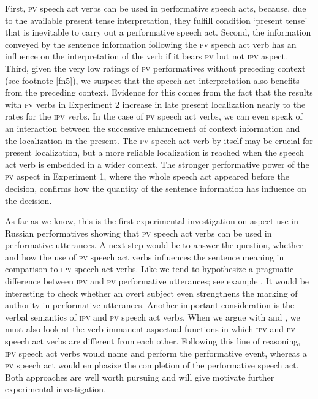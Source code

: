 \documentclass[output=paper,
colorlinks,
citecolor=brown,
newtxmath,
hidelinks
]{langscibook}
\begin{document}
First, \textsc{pv} speech act verbs can be used in performative speech acts, because, due to the available present tense interpretation, they fulfill condition ‘present tense’ that is inevitable to carry out a performative speech act. Second, the information conveyed by the sentence information following the \textsc{pv} speech act verb has an influence on the interpretation of the verb if it bears \textsc{pv} but not \textsc{ipv} aspect. Third, given the very low ratings of \textsc{pv} performatives without preceding context (see footnote \ref{fn5}), we suspect that the speech act interpretation also benefits from the preceding context. Evidence for this comes from the fact that the results with \textsc{pv} verbs in Experiment 2 increase in late present localization nearly to the rates for the \textsc{ipv} verbs. In the case of \textsc{pv} speech act verbs, we can even speak of an interaction between the successive enhancement of context information and the localization in the present. The \textsc{pv} speech act verb by itself may be crucial for present localization, but a more reliable localization is reached when the speech act verb is embedded in a wider context. The stronger performative power of the \textsc{pv} aspect in Experiment 1, where the whole speech act appeared before the decision, confirms how the quantity of the sentence information has influence on the decision.

As far as we know, this is the first experimental investigation on aspect use in Russian performatives showing that \textsc{pv} speech act verbs can be used in performative utterances. A next step would be to answer the question, whether and how the use of \textsc{pv} speech act verbs influences the sentence meaning in comparison to \textsc{ipv} speech act verbs.  Like \citeauthor{Israeli2001} we tend to hypothesize a pragmatic difference between \textsc{ipv} and \textsc{pv} performative utterances; see example . It would be interesting to check whether an overt subject even strengthens the marking of authority in performative utterances. Another important consideration is the verbal semantics of \textsc{ipv} and \textsc{pv} speech act verbs. When we argue with \citet{Breu1980} and \citet{Dewit2017}, we must also look at the verb immanent aspectual functions in which \textsc{ipv} and \textsc{pv} speech act verbs are different from each other. Following this line of reasoning, \textsc{ipv} speech act verbs would name and perform the performative event, whereas a \textsc{pv} speech act would emphasize the completion of the performative speech act. Both approaches are well worth pursuing and will give motivate further experimental investigation.
\end{document}
